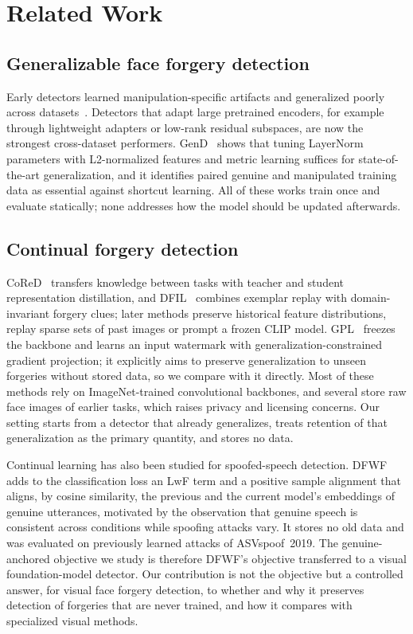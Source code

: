\documentclass{ieeeaccess}
\begin{document}
\section{Related Work}
\label{sec:related}

\subsection{Generalizable face forgery detection}
Early detectors learned manipulation-specific artifacts and generalized poorly across datasets~\cite{rossler2019faceforensics,yan2023deepfakebench}. Detectors that adapt large pretrained encoders, for example through lightweight adapters or low-rank residual subspaces, are now the strongest cross-dataset performers. GenD~\cite{yermakov2026gend} shows that tuning LayerNorm parameters with L2-normalized features and metric learning suffices for state-of-the-art generalization, and it identifies paired genuine and manipulated training data as essential against shortcut learning. All of these works train once and evaluate statically; none addresses how the model should be updated afterwards.

\subsection{Continual forgery detection}
CoReD~\cite{kim2021cored} transfers knowledge between tasks with teacher and student representation distillation, and DFIL~\cite{pan2023dfil} combines exemplar replay with domain-invariant forgery clues; later methods preserve historical feature distributions, replay sparse sets of past images or prompt a frozen CLIP model. GPL~\cite{zhang2025gpl} freezes the backbone and learns an input watermark with generalization-constrained gradient projection; it explicitly aims to preserve generalization to unseen forgeries without stored data, so we compare with it directly. Most of these methods rely on ImageNet-trained convolutional backbones, and several store raw face images of earlier tasks, which raises privacy and licensing concerns. Our setting starts from a detector that already generalizes, treats retention of that generalization as the primary quantity, and stores no data.

Continual learning has also been studied for spoofed-speech detection. DFWF~\cite{ma2021dfwf} adds to the classification loss an LwF term and a positive sample alignment that aligns, by cosine similarity, the previous and the current model's embeddings of genuine utterances, motivated by the observation that genuine speech is consistent across conditions while spoofing attacks vary. It stores no old data and was evaluated on previously learned attacks of ASVspoof~2019. The genuine-anchored objective we study is therefore DFWF's objective transferred to a visual foundation-model detector. Our contribution is not the objective but a controlled answer, for visual face forgery detection, to whether and why it preserves detection of forgeries that are never trained, and how it compares with specialized visual methods.
\end{document}
